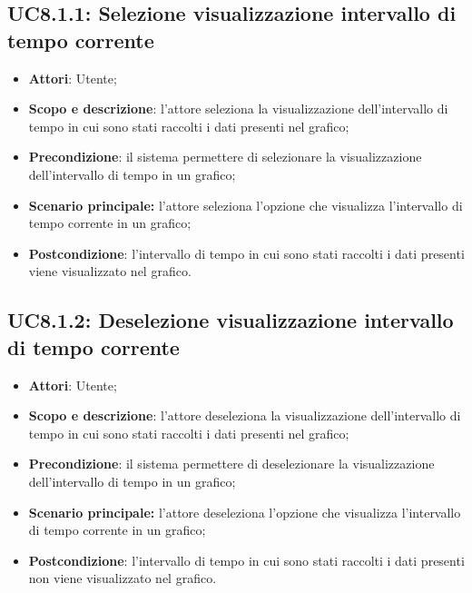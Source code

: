 \subsection{UC8.1.1: Selezione visualizzazione intervallo di tempo corrente}
\hypertarget{UC8.1.1}{}
\begin{itemize}
	\item \textbf{Attori}: Utente;
	\item \textbf{Scopo e descrizione}: l'attore seleziona la visualizzazione dell'intervallo di tempo in cui sono stati raccolti i dati presenti nel grafico;
	\item \textbf{Precondizione}: il sistema permettere di selezionare la visualizzazione dell'intervallo di tempo in un grafico;
	\item \textbf{Scenario principale:} l'attore seleziona l'opzione che visualizza l'intervallo di tempo corrente in un grafico;
	\item \textbf{Postcondizione}: l'intervallo di tempo in cui sono stati raccolti i dati presenti viene visualizzato nel grafico.
\end{itemize}

\subsection{UC8.1.2: Deselezione visualizzazione intervallo di tempo corrente}
\hypertarget{UC8.1.2}{}
\begin{itemize}
	\item \textbf{Attori}: Utente;
	\item \textbf{Scopo e descrizione}: l'attore deseleziona la visualizzazione dell'intervallo di tempo in cui sono stati raccolti i dati presenti nel grafico;
	\item \textbf{Precondizione}: il sistema permettere di deselezionare la visualizzazione dell'intervallo di tempo in un grafico;
	\item \textbf{Scenario principale:} l'attore deseleziona l'opzione che visualizza l'intervallo di tempo corrente in un grafico;
	\item \textbf{Postcondizione}: l'intervallo di tempo in cui sono stati raccolti i dati presenti non viene visualizzato nel grafico.
\end{itemize}

